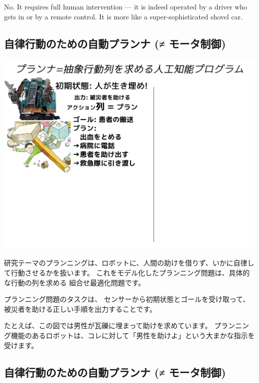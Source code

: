 \begin{resume}
No. It requires full human intervention --- it is indeed operated by a
driver who gets in or by a remote control. It is more like a
super-sophisticated shovel car.
\end{resume}


\subsection{自律行動のための自動プランナ (≠ モータ制御)}
\label{sec-1-2}

\includegraphics{img/planning/1.png}

\begin{resume}
研究テーマのプランニングは、ロボットに、人間の助けを借りず、いかに自律して行動させるかを扱います。
これをモデル化したプランニング問題は、具体的な行動の列を求める 組合せ最適化問題です。

プランニング問題のタスクは、
センサーから初期状態とゴールを受け取って、被災者を助ける正しい手順を出力することです。

たとえば、この図では男性が瓦礫に埋まって助けを求めています。
プランニング機能のあるロボットは、コレに対して「男性を助けよ」という大まかな指示を受けます。
\end{resume}

\subsection{自律行動のための自動プランナ (≠ モータ制御)}
\label{sec-1-3}

